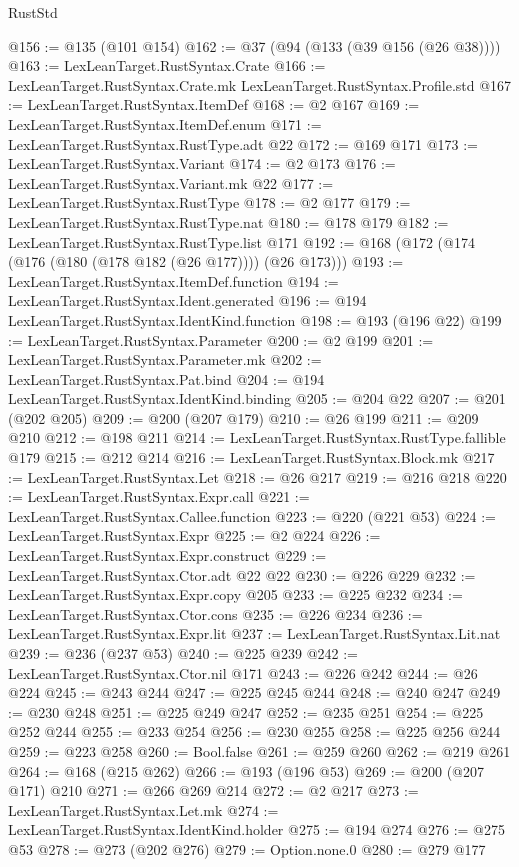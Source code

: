 \begin{lexlean}{RustStd}
\begin{coremodule}
@156 := @135 (@101 @154)
@162 := @37 (@94 (@133 (@39 @156 (@26 @38))))
@163 := LexLeanTarget.RustSyntax.Crate
@166 := LexLeanTarget.RustSyntax.Crate.mk LexLeanTarget.RustSyntax.Profile.std
@167 := LexLeanTarget.RustSyntax.ItemDef
@168 := @2 @167
@169 := LexLeanTarget.RustSyntax.ItemDef.enum
@171 := LexLeanTarget.RustSyntax.RustType.adt @22
@172 := @169 @171
@173 := LexLeanTarget.RustSyntax.Variant
@174 := @2 @173
@176 := LexLeanTarget.RustSyntax.Variant.mk @22
@177 := LexLeanTarget.RustSyntax.RustType
@178 := @2 @177
@179 := LexLeanTarget.RustSyntax.RustType.nat
@180 := @178 @179
@182 := LexLeanTarget.RustSyntax.RustType.list @171
@192 := @168 (@172 (@174 (@176 (@180 (@178 @182 (@26 @177)))) (@26 @173)))
@193 := LexLeanTarget.RustSyntax.ItemDef.function
@194 := LexLeanTarget.RustSyntax.Ident.generated
@196 := @194 LexLeanTarget.RustSyntax.IdentKind.function
@198 := @193 (@196 @22)
@199 := LexLeanTarget.RustSyntax.Parameter
@200 := @2 @199
@201 := LexLeanTarget.RustSyntax.Parameter.mk
@202 := LexLeanTarget.RustSyntax.Pat.bind
@204 := @194 LexLeanTarget.RustSyntax.IdentKind.binding
@205 := @204 @22
@207 := @201 (@202 @205)
@209 := @200 (@207 @179)
@210 := @26 @199
@211 := @209 @210
@212 := @198 @211
@214 := LexLeanTarget.RustSyntax.RustType.fallible @179
@215 := @212 @214
@216 := LexLeanTarget.RustSyntax.Block.mk
@217 := LexLeanTarget.RustSyntax.Let
@218 := @26 @217
@219 := @216 @218
@220 := LexLeanTarget.RustSyntax.Expr.call
@221 := LexLeanTarget.RustSyntax.Callee.function
@223 := @220 (@221 @53)
@224 := LexLeanTarget.RustSyntax.Expr
@225 := @2 @224
@226 := LexLeanTarget.RustSyntax.Expr.construct
@229 := LexLeanTarget.RustSyntax.Ctor.adt @22 @22
@230 := @226 @229
@232 := LexLeanTarget.RustSyntax.Expr.copy @205
@233 := @225 @232
@234 := LexLeanTarget.RustSyntax.Ctor.cons
@235 := @226 @234
@236 := LexLeanTarget.RustSyntax.Expr.lit
@237 := LexLeanTarget.RustSyntax.Lit.nat
@239 := @236 (@237 @53)
@240 := @225 @239
@242 := LexLeanTarget.RustSyntax.Ctor.nil @171
@243 := @226 @242
@244 := @26 @224
@245 := @243 @244
@247 := @225 @245 @244
@248 := @240 @247
@249 := @230 @248
@251 := @225 @249 @247
@252 := @235 @251
@254 := @225 @252 @244
@255 := @233 @254
@256 := @230 @255
@258 := @225 @256 @244
@259 := @223 @258
@260 := Bool.false
@261 := @259 @260
@262 := @219 @261
@264 := @168 (@215 @262)
@266 := @193 (@196 @53)
@269 := @200 (@207 @171) @210
@271 := @266 @269 @214
@272 := @2 @217
@273 := LexLeanTarget.RustSyntax.Let.mk
@274 := LexLeanTarget.RustSyntax.IdentKind.holder
@275 := @194 @274
@276 := @275 @53
@278 := @273 (@202 @276)
@279 := Option.none.{0}
@280 := @279 @177

\end{coremodule}
\end{lexlean}
